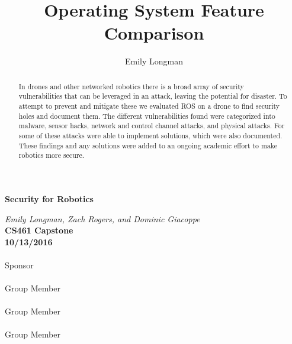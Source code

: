 \documentclass[IEEEtran,letterpaper,10pt,titlepage,draftclsnofoot,onecolumn]{article}
\title{Operating System Feature Comparison}
\author{Emily Longman}
\begin{document}
\begin{titlepage}
  \begin{center}
    \vspace*{1cm}
    
    \huge
    \textbf{Security for Robotics}      
  \vspace{0.5cm}
        
    \textit{Emily Longman, Zach Rogers, and Dominic Giacoppe}\\ 
  \vspace{0.5cm}
    \vfill
    \large
    \textbf{CS461 Capstone}\\ 
  \vspace{5mm}
    \textbf{10/13/2016}\\ 
    
  \vspace{2in}
  \makebox[2.5in]{\hrulefill} \hspace {1.0in}\makebox[2.5in]{\hrulefill} \\
  Sponsor  \\

  \vspace{.2in}
  \makebox[2.5in]{\hrulefill} \hspace {1.0in}\makebox[2.5in]{\hrulefill} \\
  Group Member  \\

  \vspace{.2in}
  \makebox[2.5in]{\hrulefill} \hspace {1.0in}\makebox[2.5in]{\hrulefill} \\
  Group Member  \\

  \vspace{.2in}
  \makebox[2.5in]{\hrulefill} \hspace {1.0in}\makebox[2.5in]{\hrulefill} \\
  Group Member  \\
    
    \vfill
    \end{center}
\end{titlepage}

\begin{abstract}
In drones and other networked robotics there is a broad array of security vulnerabilities that can be leveraged in an attack, leaving the potential for disaster. 
To attempt to prevent and mitigate these we evaluated ROS on a drone to find security holes and document them. 
The different vulnerabilities found were categorized into malware, sensor hacks, network and control channel attacks, and physical attacks. 
For some of these attacks were able to implement solutions, which were also documented.
These findings and any solutions were added to an ongoing academic effort to make robotics more secure.
\end{abstract}
\end{document}
